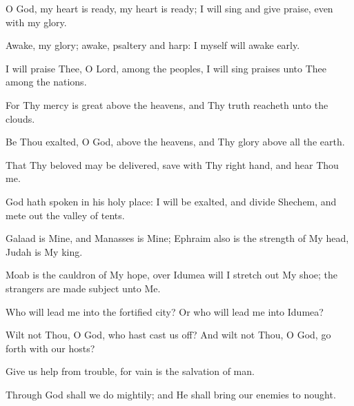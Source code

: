 O God, my heart is ready, my heart is ready; I will sing and give praise, even with my glory.

Awake, my glory; awake, psaltery and harp: I myself will awake early.

I will praise Thee, O Lord, among the peoples, I will sing praises unto Thee among the nations.

For Thy mercy is great above the heavens, and Thy truth reacheth unto the clouds.

Be Thou exalted, O God, above the heavens, and Thy glory above all the earth.

That Thy beloved may be delivered, save with Thy right hand, and hear Thou me.

God hath spoken in his holy place: I will be exalted, and divide Shechem, and mete out the valley of tents.

Galaad is Mine, and Manasses is Mine; Ephraim also is the strength of My head, Judah is My king.

Moab is the cauldron of My hope, over Idumea will I stretch out My shoe; the strangers are made subject unto Me.

Who will lead me into the fortified city? Or who will lead me into Idumea?

Wilt not Thou, O God, who hast cast us off? And wilt not Thou, O God, go forth with our hosts?

Give us help from trouble, for vain is the salvation of man.

Through God shall we do mightily; and He shall bring our enemies to nought.
